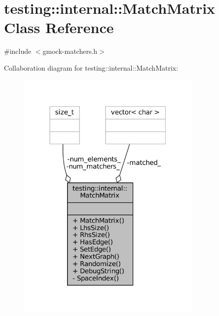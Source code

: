 \hypertarget{classtesting_1_1internal_1_1MatchMatrix}{}\section{testing\+:\+:internal\+:\+:Match\+Matrix Class Reference}
\label{classtesting_1_1internal_1_1MatchMatrix}


{\ttfamily \#include $<$gmock-\/matchers.\+h$>$}



Collaboration diagram for testing\+:\+:internal\+:\+:Match\+Matrix\+:
\nopagebreak
\begin{figure}[H]
\begin{center}
\leavevmode
\includegraphics[width=256pt]{classtesting_1_1internal_1_1MatchMatrix__coll__graph}
\end{center}
\end{figure}
